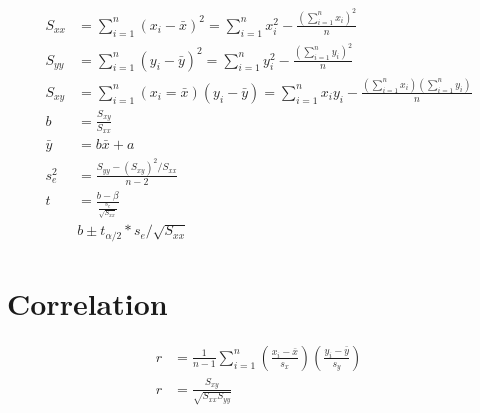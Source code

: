 \documentclass[11pt]{article}
\begin{document}
\begin{align*}
  S_{xx}&= \sum_{i=1}^n(x_i-\bar{x})^2  =
  \sum_{i=1}^nx_i^2-\frac{(\sum_{i=1}^nx_i)^2}{n}\\
  S_{yy} &= \sum_{i=1}^n(y_i-\bar{y})^2  =
  \sum_{i=1}^ny_i^2-\frac{(\sum_{i=1}^ny_i)^2}{n}\\
  S_{xy} &= \sum_{i=1}^n (x_i=\bar{x})(y_i-\bar{y}) =
  \sum_{i=1}^nx_iy_i-\frac{(\sum_{i=1}^nx_i)(\sum_{i=1}^ny_i)}{n}\\
  b &= \frac{S_{xy}}{S_{xx}}\\
  \bar{y} &= b\bar{x}+a\\
  s_e^2&=\frac{S_{yy}-(S_{xy})^2/S_{xx}}{n-2}\\
  t &= \frac{b-\beta}{\frac{s_e}{\sqrt{S_{xx}}}}\\
  & b\pm t_{\alpha/2}*s_e/\sqrt{S_{xx}}
\end{align*}

\section{Correlation}
\begin{align*}
  r &=
  \frac{1}{n-1}\sum_{i=1}^n(\frac{x_i-\bar{x}}{s_x})(\frac{y_i-\bar{y}}{s_y})\\
  r &= \frac{S_{xy}}{\sqrt{S_{xx}S_{yy}}}
\end{align*}
\end{document}
